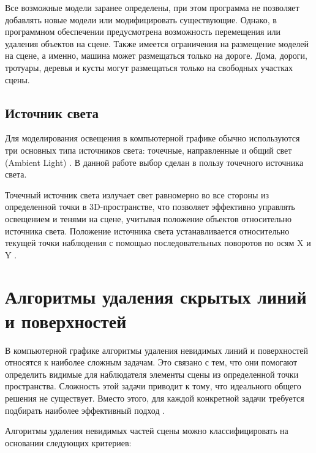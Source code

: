 Все возможные модели заранее определены, при этом программа не позволяет добавлять новые модели или модифицировать существующие. Однако, в программном обеспечении предусмотрена возможность перемещения или удаления объектов на сцене. Также имеется ограничения на размещение моделей на сцене, а именно, машина может размещаться только на дороге. Дома, дороги, тротуары, деревья и кусты могут размещаться только на свободных участках сцены.


\subsection{Источник света}

Для моделирования освещения в компьютерной графике обычно используются три основных типа источников света: точечные, направленные и общий свет (Ambient Light) \cite{light}. В данной работе выбор сделан в пользу точечного источника света.

Точечный источник света излучает свет равномерно во все стороны из определенной точки в 3D-пространстве, что позволяет эффективно управлять освещением и тенями на сцене, учитывая положение объектов относительно источника света. Положение источника света устанавливается относительно текущей точки наблюдения с помощью последовательных поворотов по осям X и Y \cite{light}.

\section{Алгоритмы удаления скрытых линий и поверхностей}

В компьютерной графике алгоритмы удаления невидимых линий и поверхностей относятся к наиболее сложным задачам. Это связано с тем, что они помогают определить видимые для наблюдателя элементы сцены из определенной точки пространства. Сложность этой задачи приводит к тому, что идеального общего решения не существует. Вместо этого, для каждой конкретной задачи требуется подбирать наиболее эффективный подход \cite{del_line}.


Алгоритмы удаления невидимых частей сцены можно классифицировать на основании следующих критериев:

